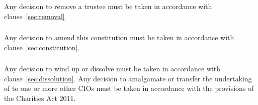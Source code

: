         \subsubsection{}
        Any decision to remove a trustee must be taken in accordance with clause~\ref{sec:removal}

        \subsubsection{}
        Any decision to amend this constitution must be taken in accordance with clause~\ref{sec:constitution}.

        \subsubsection{}
        Any decision to wind up or dissolve \shortname{} must be taken in accordance with clause~\ref{sec:dissolution}. Any decision to amalgamate or transfer the undertaking of \shortname{} to one or more other CIOs must be taken in accordance with the provisions of the Charities Act 2011.


